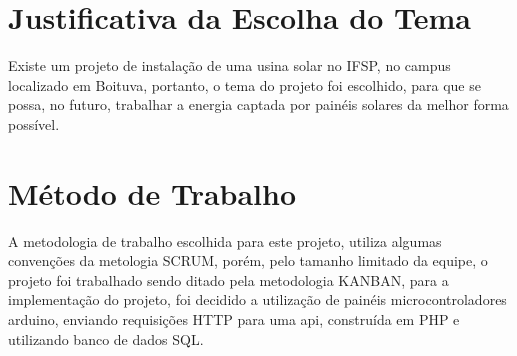 \section{Justificativa da Escolha do Tema}

Existe um projeto de instalação de uma usina solar no IFSP, no campus localizado em Boituva, portanto, o tema do projeto foi escolhido, para que se possa, no futuro, trabalhar a energia captada por painéis solares da melhor forma possível.

\section{Método de Trabalho}

A metodologia de trabalho escolhida para este projeto, utiliza algumas convenções da metologia SCRUM, porém, pelo tamanho limitado da equipe, o projeto foi trabalhado sendo ditado pela metodologia KANBAN, para a implementação do projeto, foi decidido a utilização de painéis microcontroladores arduino, enviando requisições HTTP para uma api, construída em PHP e utilizando banco de dados SQL.

